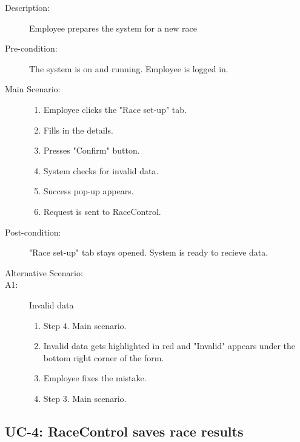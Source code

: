 \documentclass{article}
\begin{document}
\begin{description}
    \item[Description:] Employee prepares the system for a new race
    \item[Pre-condition:] The system is on and running. Employee is logged in.
    \item[Main Scenario:] \hfill
    \begin{enumerate}
        \item Employee clicks the "Race set-up" tab.
        \item Fills in the details.
        \item Presses "Confirm" button.
        \item System checks for invalid data.
        \item Success pop-up appears.
        \item Request is sent to RaceControl.
    \end{enumerate}
    \item[Post-condition:] "Race set-up" tab stays opened. System is ready to recieve data.
    \item[Alternative Scenario:] \hfill
    \item[A1:] Invalid data 
    \begin{enumerate}
        \item Step 4. Main scenario.
        \item Invalid data gets highlighted in red and "Invalid" appears under the bottom right corner of the form.
        \item Employee fixes the mistake.
        \item Step 3. Main scenario.
    \end{enumerate}
\end{description}

\newpage

\subsection{UC-4: RaceControl saves race results}
\end{document}
